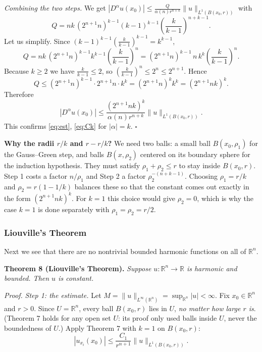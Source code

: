 \documentclass[11pt]{article}
\theoremstyle{plain}
\theoremstyle{definition}
\theoremstyle{remark}
\begin{document}
\emph{Combining the two steps.} We get $|D^\alpha u(x_0)| \leq \frac{Q}{\alpha(n) r^{n+k}}\|u\|_{L^1(B(x_0,r))}$ with
$$ Q = nk\,(2^{n+1}n)^{k-1}(k-1)^{k-1}\left(\frac{k}{k-1}\right)^{n+k-1}. $$
Let us simplify. Since $(k-1)^{k-1}\left(\frac{k}{k-1}\right)^{k-1} = k^{k-1}$,
$$ Q = nk\,(2^{n+1}n)^{k-1}k^{k-1}\left(\frac{k}{k-1}\right)^n = (2^{n+1}n)^{k-1}\, n\, k^k\left(\frac{k}{k-1}\right)^n. $$
Because $k \geq 2$ we have $\frac{k}{k-1} \leq 2$, so $\left(\frac{k}{k-1}\right)^n \leq 2^n \le 2^{n+1}$. Hence
$$ Q \leq (2^{n+1}n)^{k-1}\cdot 2^{n+1}n\cdot k^k = (2^{n+1}n)^k k^k = (2^{n+1}nk)^k. $$
Therefore
\begin{equation}\label{eq:estk}
|D^\alpha u(x_0)| \leq \frac{(2^{n+1}nk)^k}{\alpha(n)r^{n+k}}\|u\|_{L^1(B(x_0,r))}.
\end{equation}
This confirms \eqref{eq:est}, \eqref{eq:Ck} for $|\alpha| = k$. $\square$

\textbf{Why the radii $r/k$ and $r - r/k$?} We need two balls: a small ball $B(x_0,\rho_1)$ for the Gauss--Green step, and balls $B(x,\rho_2)$ centered on its boundary sphere for the induction hypothesis. They must satisfy $\rho_1 + \rho_2 \leq r$ to stay inside $B(x_0,r)$. Step 1 costs a factor $n/\rho_1$ and Step 2 a factor $\rho_2^{-(n+k-1)}$. Choosing $\rho_1 = r/k$ and $\rho_2 = r(1 - 1/k)$ balances these so that the constant comes out exactly in the form $(2^{n+1}nk)^k$. For $k = 1$ this choice would give $\rho_2 = 0$, which is why the case $k = 1$ is done separately with $\rho_1 = \rho_2 = r/2$.

\subsubsection{Liouville's Theorem}
Next we see that there are no nontrivial bounded harmonic functions on all of $\mathbb{R}^n$.

\textbf{Theorem 8 (Liouville's Theorem).} \textit{Suppose $u : \mathbb{R}^n \to \mathbb{R}$ is harmonic and bounded. Then $u$ is constant.}

\textit{Proof.} \emph{Step 1: the estimate.} Let $M = \|u\|_{L^\infty(\mathbb{R}^n)} = \sup_{\mathbb{R}^n}|u| < \infty$. Fix $x_0 \in \mathbb{R}^n$ and $r > 0$. Since $U = \mathbb{R}^n$, every ball $B(x_0,r)$ lies in $U$, \emph{no matter how large $r$ is}. (Theorem 7 holds for any open set $U$: its proof only used balls inside $U$, never the boundedness of $U$.) Apply Theorem 7 with $k = 1$ on $B(x_0,r)$:
$$ |u_{x_i}(x_0)| \leq \frac{C_1}{r^{n+1}}\|u\|_{L^1(B(x_0,r))}. $$
\end{document}
